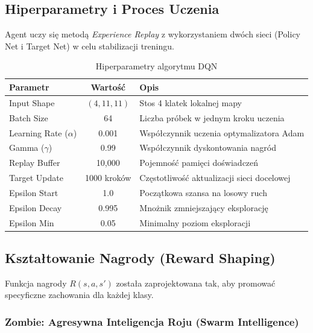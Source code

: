 \documentclass[12pt,a4paper]{article}
\begin{document}
\subsection{Hiperparametry i Proces Uczenia}

Agent uczy się metodą \textit{Experience Replay} z wykorzystaniem dwóch sieci
(Policy Net i Target Net) w celu stabilizacji treningu.

\begin{table}[H]
	\centering
	\caption{Hiperparametry algorytmu DQN}
	\label{tab:dqn_params}
	\begin{tabular}{|l|c|l|}
		\hline
		\textbf{Parametr}        & \textbf{Wartość} & \textbf{Opis}                              \\ \hline
		Input Shape              & $(4, 11, 11)$    & Stos 4 klatek lokalnej mapy                \\ \hline
		Batch Size               & 64               & Liczba próbek w jednym kroku uczenia       \\ \hline
		Learning Rate ($\alpha$) & 0.001            & Współczynnik uczenia optymalizatora Adam   \\ \hline
		Gamma ($\gamma$)         & 0.99             & Współczynnik dyskontowania nagród          \\ \hline
		Replay Buffer            & 10,000           & Pojemność pamięci doświadczeń              \\ \hline
		Target Update            & 1000 kroków      & Częstotliwość aktualizacji sieci docelowej \\ \hline
		Epsilon Start            & 1.0              & Początkowa szansa na losowy ruch           \\ \hline
		Epsilon Decay            & 0.995            & Mnożnik zmniejszający eksplorację          \\ \hline
		Epsilon Min              & 0.05             & Minimalny poziom eksploracji               \\ \hline
	\end{tabular}
\end{table}

\subsection{Kształtowanie Nagrody (Reward Shaping)}

Funkcja nagrody $R(s, a, s')$ została zaprojektowana tak, aby promować
specyficzne zachowania dla każdej klasy.

\subsubsection{Zombie: Agresywna Inteligencja Roju (Swarm Intelligence)}
\end{document}
